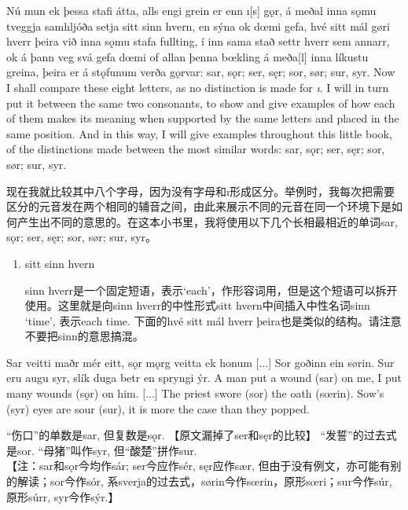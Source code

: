 \begin{paracol}{2}
  Nú mun ek þessa stafi átta, alls engi grein er enn ı[s] gǫr, á meðal inna sǫmu tveggja samhljóða setja sitt sinn hvern, en sýna ok dœmi gefa, hvé sitt mál gøri hverr þeira við inna sǫmu stafa fullting, í inn sama stað settr hverr sem annarr, ok á þann veg svá gefa dœmi of allan þenna bœkling á meða[l] inna líkustu greina, þeira er á stǫfunum verða gǫrvar: sar, sǫr; ser, sęr; sor, sør; sur, syr.
  \switchcolumn
  Now I shall compare these eight letters, as no distinction is made for \textit{ı}. I will in turn put it between the same two consonants, to show and give examples of how each of them makes its meaning when supported by the same letters and placed in the same position. And in this way, I will give examples throughout this little book, of the distinctions made between the most similar words: sar, sǫr; ser, sęr; sor, sør; sur, syr.
\end{paracol}
\begin{translation*}{}
  现在我就比较其中八个字母，因为没有字母和ı形成区分。举例时，我每次把需要区分的元音发在两个相同的辅音之间，由此来展示不同的元音在同一个环境下是如何产生出不同的意思的。在这本小书里，我将使用以下几个长相最相近的单词sar, sǫr; ser, sęr; sor, sør; sur, syr。
\end{translation*}
\begin{grammar*}{}
  \begin{enumerate}[leftmargin=*]
    \item sitt sinn hvern

          sinn hverr是一个固定短语，表示`each'，作形容词用，但是这个短语可以拆开使用。这里就是向sinn hverr的中性形式sitt hvern中间插入中性名词sinn `time', 表示each time. 下面的hvé sitt mál hverr þeira也是类似的结构。请注意不要把sinn的意思搞混。
  \end{enumerate}
\end{grammar*}
\begin{paracol}{2}
  Sar veitti maðr mér eitt, sǫr mǫrg veitta ek honum [...] Sor goðinn ein sørin. Sur eru augu syr, slík duga betr en spryngi ýr.
  \switchcolumn
  A man put a wound (sar) on me, I put many wounds (sǫr) on him. [...] The priest swore (sor) the oath (sœrin). Sow's (syr) eyes are sour (sur), it is more the case than they popped.
\end{paracol}
\begin{translation*}{}
  “伤口”的单数是sar, 但复数是sǫr. 【原文漏掉了ser和sęr的比较】 “发誓”的过去式是sor. “母猪”叫作syr, 但“酸楚”拼作sur.\\

  【注：sar和sǫr今均作sár; ser今应作sér, sęr应作sær, 但由于没有例文，亦可能有别的解读；sor今作sór, 系sverja的过去式，sørin今作sœrin，原形sœri；sur今作súr, 原形súrr, syr今作sýr.】
\end{translation*}

